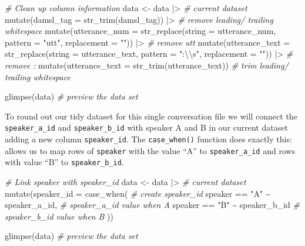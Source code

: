 \documentclass[
  letterpaper,
  DIV=11,
  numbers=noendperiod]{scrreport}
\newenvironment{Shaded}{\begin{snugshade}}{\end{snugshade}}
\newcommand{\AttributeTok}[1]{\textcolor[rgb]{0.00,0.00,0.00}{#1}}
\newcommand{\CommentTok}[1]{\textcolor[rgb]{0.00,0.00,0.00}{\textit{#1}}}
\newcommand{\FunctionTok}[1]{\textcolor[rgb]{0.00,0.00,0.00}{#1}}
\newcommand{\NormalTok}[1]{\textcolor[rgb]{0.00,0.00,0.00}{#1}}
\newcommand{\OtherTok}[1]{\textcolor[rgb]{0.00,0.00,0.00}{#1}}
\newcommand{\SpecialCharTok}[1]{\textcolor[rgb]{0.00,0.00,0.00}{#1}}
\newcommand{\StringTok}[1]{\textcolor[rgb]{0.00,0.00,0.00}{#1}}
\theoremstyle{definition}
\theoremstyle{remark}
\begin{document}
\begin{Shaded}
\begin{Highlighting}[]
\CommentTok{\# Clean up column information}
\NormalTok{data }\OtherTok{\textless{}{-}} 
\NormalTok{  data }\SpecialCharTok{|\textgreater{}} \CommentTok{\# current dataset}
  \FunctionTok{mutate}\NormalTok{(}\AttributeTok{damsl\_tag =} \FunctionTok{str\_trim}\NormalTok{(damsl\_tag)) }\SpecialCharTok{|\textgreater{}} \CommentTok{\# remove leading/ trailing whitespace}
  \FunctionTok{mutate}\NormalTok{(}\AttributeTok{utterance\_num =} \FunctionTok{str\_replace}\NormalTok{(}\AttributeTok{string =}\NormalTok{ utterance\_num, }\AttributeTok{pattern =} \StringTok{"utt"}\NormalTok{, }\AttributeTok{replacement =} \StringTok{""}\NormalTok{)) }\SpecialCharTok{|\textgreater{}} \CommentTok{\# remove \textquotesingle{}utt\textquotesingle{}}
  \FunctionTok{mutate}\NormalTok{(}\AttributeTok{utterance\_text =} \FunctionTok{str\_replace}\NormalTok{(}\AttributeTok{string =}\NormalTok{ utterance\_text, }\AttributeTok{pattern =} \StringTok{":}\SpecialCharTok{\textbackslash{}\textbackslash{}}\StringTok{s"}\NormalTok{, }\AttributeTok{replacement =} \StringTok{""}\NormalTok{)) }\SpecialCharTok{|\textgreater{}} \CommentTok{\# remove \textquotesingle{}: \textquotesingle{}}
  \FunctionTok{mutate}\NormalTok{(}\AttributeTok{utterance\_text =} \FunctionTok{str\_trim}\NormalTok{(utterance\_text)) }\CommentTok{\# trim leading/ trailing whitespace}

\FunctionTok{glimpse}\NormalTok{(data) }\CommentTok{\# preview the data set}
\end{Highlighting}
\end{Shaded}

To round out our tidy dataset for this single conversation file we will
connect the \texttt{speaker\_a\_id} and \texttt{speaker\_b\_id} with
speaker A and B in our current dataset adding a new column
\texttt{speaker\_id}. The \texttt{case\_when()} function does exactly
this: allows us to map rows of \texttt{speaker} with the value ``A'' to
\texttt{speaker\_a\_id} and rows with value ``B'' to
\texttt{speaker\_b\_id}.

\begin{Shaded}
\begin{Highlighting}[]
\CommentTok{\# Link speaker with speaker\_id}
\NormalTok{data }\OtherTok{\textless{}{-}} 
\NormalTok{  data }\SpecialCharTok{|\textgreater{}} \CommentTok{\# current dataset}
  \FunctionTok{mutate}\NormalTok{(}\AttributeTok{speaker\_id =} \FunctionTok{case\_when}\NormalTok{( }\CommentTok{\# create speaker\_id}
\NormalTok{    speaker }\SpecialCharTok{==} \StringTok{"A"} \SpecialCharTok{\textasciitilde{}}\NormalTok{ speaker\_a\_id, }\CommentTok{\# speaker\_a\_id value when A}
\NormalTok{    speaker }\SpecialCharTok{==} \StringTok{"B"} \SpecialCharTok{\textasciitilde{}}\NormalTok{ speaker\_b\_id }\CommentTok{\# speaker\_b\_id value when B}
\NormalTok{  ))}

\FunctionTok{glimpse}\NormalTok{(data) }\CommentTok{\# preview the data set}
\end{Highlighting}
\end{Shaded}
\end{document}
